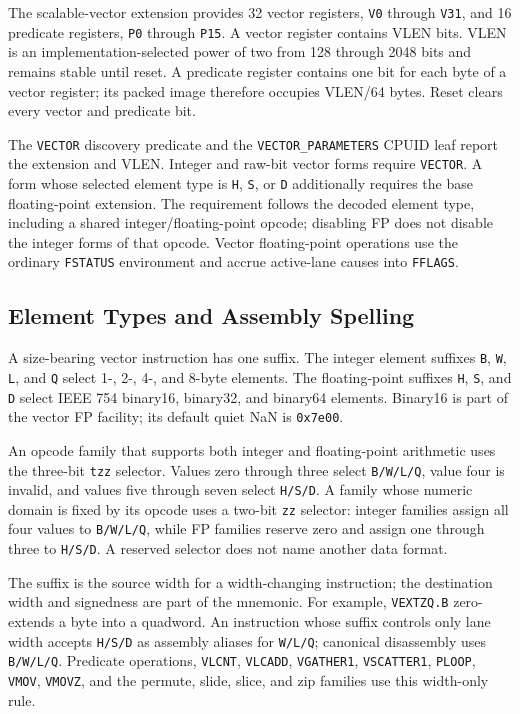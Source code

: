 \label{section:vector-register-model}
The scalable-vector extension provides 32 vector registers, \texttt{V0}
through \texttt{V31}, and 16 predicate registers, \texttt{P0} through
\texttt{P15}.  A vector register contains VLEN bits.  VLEN is an
implementation-selected power of two from 128 through 2048 bits and remains
stable until reset.  A predicate register contains one bit for each byte of a
vector register; its packed image therefore occupies VLEN/64 bytes.  Reset
clears every vector and predicate bit.

The \texttt{VECTOR} discovery predicate and the \texttt{VECTOR\_PARAMETERS}
CPUID leaf report the extension and VLEN.  Integer and raw-bit vector forms
require \texttt{VECTOR}.  A form whose selected element type is \texttt{H},
\texttt{S}, or \texttt{D} additionally requires the base floating-point
extension.  The requirement follows the decoded element type, including a
shared integer/floating-point opcode; disabling FP does not disable the
integer forms of that opcode.  Vector floating-point operations use the
ordinary \texttt{FSTATUS} environment and accrue active-lane causes into
\texttt{FFLAGS}.

\subsection{Element Types and Assembly Spelling}

A size-bearing vector instruction has one suffix.  The integer element
suffixes \texttt{B}, \texttt{W}, \texttt{L}, and \texttt{Q} select 1-, 2-,
4-, and 8-byte elements.  The floating-point suffixes \texttt{H}, \texttt{S},
and \texttt{D} select IEEE 754 binary16, binary32, and binary64 elements.
Binary16 is part of the vector FP facility; its default quiet NaN is
\texttt{0x7e00}.

An opcode family that supports both integer and floating-point arithmetic
uses the three-bit \texttt{tzz} selector.  Values zero through three select
\texttt{B/W/L/Q}, value four is invalid, and values five through seven select
\texttt{H/S/D}.  A family whose numeric domain is fixed by its opcode uses a
two-bit \texttt{zz} selector: integer families assign all four values to
\texttt{B/W/L/Q}, while FP families reserve zero and assign one through three
to \texttt{H/S/D}.  A reserved selector does not name another data format.

The suffix is the source width for a width-changing instruction; the
destination width and signedness are part of the mnemonic.  For example,
\texttt{VEXTZQ.B} zero-extends a byte into a quadword.  An instruction whose
suffix controls only lane width accepts \texttt{H/S/D} as assembly aliases for
\texttt{W/L/Q}; canonical disassembly uses \texttt{B/W/L/Q}.  Predicate
operations, \texttt{VLCNT}, \texttt{VLCADD}, \texttt{VGATHER1},
\texttt{VSCATTER1}, \texttt{PLOOP}, \texttt{VMOV}, \texttt{VMOVZ},
and the permute, slide, slice, and zip families use this width-only rule.

